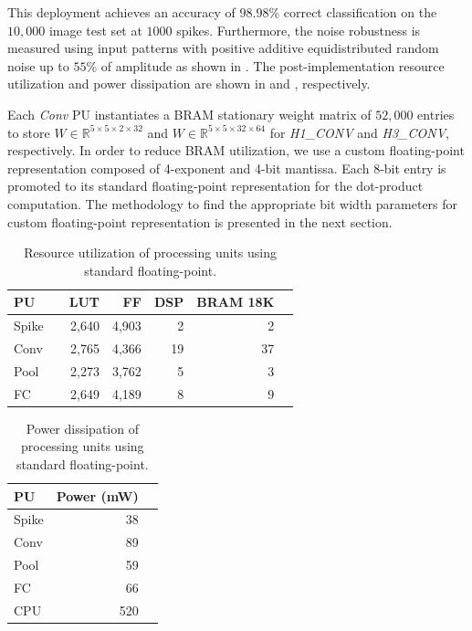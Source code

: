 This deployment achieves an accuracy of $98.98\%$ correct classification on the $10,000$ image test set at $1000$ spikes. Furthermore, the noise robustness is measured using input patterns with positive additive equidistributed random noise up to $55\%$ of amplitude as shown in . The post-implementation resource utilization and power dissipation are shown in  and , respectively.

Each \emph{Conv} PU instantiates a BRAM stationary weight matrix of $52,000$ entries to store $W\in\mathbb{R}^{5\times 5\times 2\times 32}$ and $W\in\mathbb{R}^{5\times 5\times 32\times 64}$ for \emph{H1\_CONV} and \emph{H3\_CONV}, respectively. In order to reduce BRAM utilization, we use a custom floating-point representation composed of 4-exponent and 4-bit mantissa. Each 8-bit entry is promoted to its standard floating-point representation for the dot-product computation. The methodology to find the appropriate bit width parameters for custom floating-point representation is presented in the next section.

\begin{table}[!h]\centering
	\caption{Resource utilization of processing units using standard floating-point.}\label{tab:resource_fp}
	\scriptsize
	\begin{tabular}{lrrrrrr}\toprule
		\textbf{PU} & &\textbf{LUT} &\textbf{FF} &\textbf{DSP} &\textbf{BRAM 18K} \\\midrule
		Spike & &2,640 &4,903 &2 &2 \\
		Conv & &2,765 &4,366 &19 &37 \\
		Pool & &2,273 &3,762 &5 &3 \\
		FC & &2,649 &4,189 &8 &9 \\
		\bottomrule
	\end{tabular}
\end{table}

\begin{table}[!h]\centering
	\caption{Power dissipation of processing units using standard floating-point.}\label{tab:power_fp}
	\scriptsize
	\begin{tabular}{lrr}\toprule
		\textbf{PU} &\textbf{Power (mW)} \\\midrule
		Spike &38 \\
		Conv &89 \\
		Pool &59 \\
		FC &66 \\
		CPU &520 \\
		\bottomrule
	\end{tabular}
\end{table}

